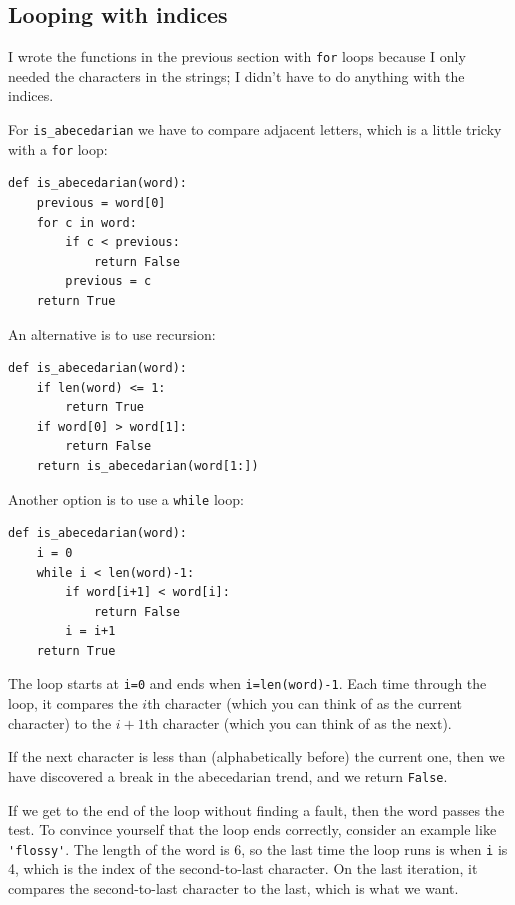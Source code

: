 \documentclass[10pt]{book}
\begin{document}
\begin{CJK}{UTF8}{gbsn}
\section{Looping with indices}

I wrote the functions in the previous section with {\tt for}
loops because I only needed the characters in the strings; I didn't
have to do anything with the indices.

For \verb"is_abecedarian" we have to compare adjacent letters,
which is a little tricky with a {\tt for} loop:

\begin{verbatim}
def is_abecedarian(word):
    previous = word[0]
    for c in word:
        if c < previous:
            return False
        previous = c
    return True
\end{verbatim}


An alternative is to
use recursion:

\begin{verbatim}
def is_abecedarian(word):
    if len(word) <= 1:
        return True
    if word[0] > word[1]:
        return False
    return is_abecedarian(word[1:])
\end{verbatim}

Another option is to use a {\tt while} loop:

\begin{verbatim}
def is_abecedarian(word):
    i = 0
    while i < len(word)-1:
        if word[i+1] < word[i]:
            return False
        i = i+1
    return True
\end{verbatim}
%
The loop starts at {\tt i=0} and ends when {\tt i=len(word)-1}.  Each
time through the loop, it compares the $i$th character (which you can
think of as the current character) to the $i+1$th character (which you
can think of as the next).

If the next character is less than (alphabetically before) the current
one, then we have discovered a break in the abecedarian trend, and
we return {\tt False}.

If we get to the end of the loop without finding a fault, then the
word passes the test.  To convince yourself that the loop ends
correctly, consider an example like \verb"'flossy'".  The
length of the word is 6, so
the last time the loop runs is when {\tt i} is 4, which is the
index of the second-to-last character.  On the last iteration,
it compares the second-to-last character to the last, which is
what we want.


\end{CJK}
\end{document}
